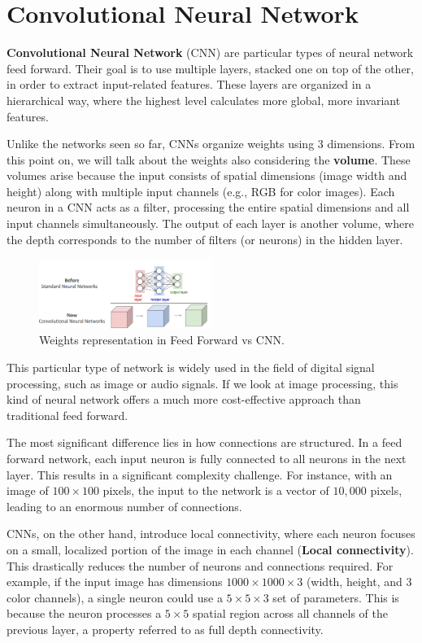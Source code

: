 \chapter{Convolutional Neural Network}
\textbf{Convolutional Neural Network} (CNN) are particular types of neural network
feed forward. Their goal is to use multiple layers, stacked one on top of the other,
in order to extract input-related features. These layers are organized in a
hierarchical way, where the highest level calculates more global, more invariant
features.

Unlike the networks seen so far, CNNs organize weights using 3 dimensions. From
this point on, we will talk about the weights also considering the \textbf{volume}.
These volumes arise because the input consists of spatial dimensions (image width and
height) along with multiple input channels (e.g., RGB for color images). Each
neuron in a CNN acts as a filter, processing the entire spatial dimensions and
all input channels simultaneously. The output of each layer is another volume,
where the depth corresponds to the number of filters (or neurons) in the hidden
layer.

\begin{figure}[!ht]
    \centering
    \includegraphics[width=0.5\textwidth]{img/CNN/weights.png}
    \caption{Weights representation in Feed Forward vs CNN.}
    \label{fig:weights}
\end{figure}

This particular type of network is widely used in the field of digital signal
processing, such as image or audio signals. If we look at image processing, this
kind of neural network offers a much more cost-effective approach than traditional
feed forward.

The most significant difference lies in how connections are structured. In a
feed forward network, each input neuron is fully connected to all neurons in the
next layer. This results in a significant complexity challenge. For instance,
with an image of $100 \times 100$ pixels, the input to the network is a vector
of $10,000$ pixels, leading to an enormous number of connections.

CNNs, on the other hand, introduce local connectivity, where each neuron focuses
on a small, localized portion of the image in each channel (\textbf{Local
    connectivity}). This drastically reduces the number of neurons and connections
required. For example, if the input image has dimensions $1000 \times 1000 \times 3$
(width, height, and 3 color channels), a single neuron could use a $5 \times 5 \times 3$
set of parameters. This is because the neuron processes a $5 \times 5$ spatial
region across all channels of the previous layer, a property referred to as full
depth connectivity.

